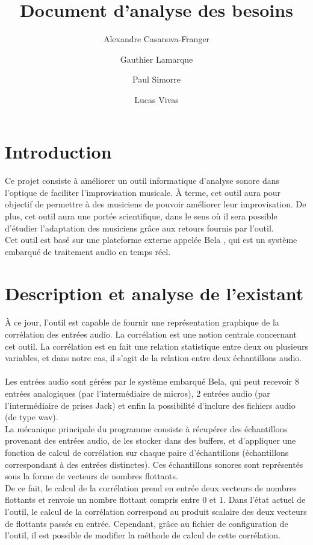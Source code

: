 \documentclass{article}
\title{Document d'analyse des besoins}
\author{Alexandre Casanova-Franger\\
        \and
        Gauthier Lamarque\\
        \and
        Paul Simorre\\
        \and
        Lucas Vivas\\}
\begin{document}
\maketitle
\section{Introduction}
\paragraph{}
Ce projet consiste à améliorer un outil informatique d'analyse sonore dans
l'optique de faciliter l'improvisation musicale. À terme, cet outil aura pour
objectif de permettre à des musiciens de pouvoir améliorer leur
improvisation. De plus, cet outil aura une portée scientifique, dans le sens
où il sera possible d'étudier l'adaptation des musiciens grâce aux retours
fournis par l'outil. \\
Cet outil est basé sur une plateforme externe appelée Bela \cite{BELA},
qui est un système embarqué de traitement audio en temps réel.
\section{Description et analyse de l'existant}
\paragraph{}
À ce jour, l'outil est capable de fournir une représentation graphique de la
corrélation des entrées audio. La corrélation est une notion centrale
concernant cet outil. La corrélation est en fait une relation statistique
entre deux ou plusieurs variables, et dans notre cas, il s'agit de la
relation entre deux échantillons audio.
\paragraph{}
Les entrées audio sont gérées par le système embarqué Bela, qui peut
recevoir 8 entrées analogiques (par l'intermédiaire de micros), 2 entrées
audio (par l'intermédiaire de prises Jack) et enfin la possibilité d'inclure
des fichiers audio (de type wav).\\
La mécanique principale du programme consiste à récupérer des échantillons
provenant des entrées audio, de les stocker dans des buffers, et d'appliquer
une fonction de calcul de corrélation sur chaque paire d'échantillons
(échantillons correspondant à des entrées distinctes). Ces échantillons
sonores sont représentés sous la forme de vecteurs de nombres flottants.\\
De ce fait, le calcul de la corrélation prend en entrée deux vecteurs de
nombres flottants et renvoie un nombre flottant compris entre 0 et 1.
Dans l'état actuel de l'outil, le calcul de la corrélation correspond au
produit scalaire des deux vecteurs de flottants passés en entrée. Cependant,
grâce au fichier de configuration de l'outil, il est possible de modifier la
méthode de calcul de cette corrélation.
\end{document}

